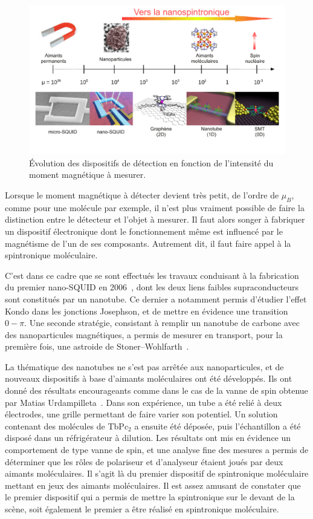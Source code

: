 \begin{figure}
\centering \includegraphics[scale=0.45]{Spintronique/Group1/Group1.pdf}
\caption{\'Evolution des dispositifs de détection en fonction de l'intensité du moment magnétique à mesurer.}
\label{Group1}
\end{figure}



Lorsque le moment magnétique à détecter devient très petit, de l'ordre de $\mu_B$, comme pour une molécule par exemple, il n'est plus vraiment possible de faire la distinction entre le détecteur et l'objet à mesurer. Il faut alors songer à fabriquer un dispositif électronique dont le fonctionnement même est influencé par le magnétisme de l'un de ses composants. Autrement dit, il faut faire appel à la spintronique moléculaire.

C'est dans ce cadre que se sont effectués les travaux conduisant à la fabrication du premier nano-SQUID en 2006~\cite{CleuziouJ.-P.2006}, dont les deux liens faibles supraconducteurs sont constitués par un nanotube. Ce dernier a notamment permis d'étudier l'effet Kondo dans les jonctions Josephson, et de mettre en évidence une transition $0-\pi$. Une seconde stratégie, consistant à remplir un nanotube de carbone avec des nanoparticules magnétiques, a permis de mesurer en transport, pour la première fois, une astroide de Stoner–Wohlfarth~\cite{Cleuziou2011}.

La thématique des nanotubes ne s'est pas arrêtée aux nanoparticules, et de nouveaux dispositifs à base d'aimants moléculaires ont été développés. Ils ont donné des résultats encourageants comme dans le cas de la vanne de spin obtenue par Matias Urdampilleta~\cite{Urdampilleta2011}. Dans son expérience, un tube a été relié à deux électrodes, une grille permettant de faire varier son potentiel. Un solution contenant des molécules de TbPc$_{2}$ a ensuite été déposée, puis l'échantillon a été disposé dans un réfrigérateur à dilution. Les résultats ont mis en évidence un comportement de type vanne de spin, et une analyse fine des mesures a permis de déterminer que les rôles de polariseur et d'analyseur étaient joués par deux aimants moléculaires. Il s'agit là du premier dispositif de spintronique moléculaire mettant en jeux des aimants moléculaires. Il est assez amusant de constater que le premier dispositif qui a permis de mettre la spintronique sur le devant de la scène, soit également le premier a être réalisé en spintronique moléculaire.

